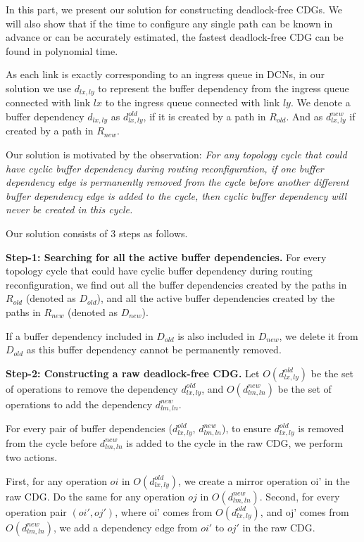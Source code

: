 In this part, we present our solution for constructing deadlock-free CDGs. We will also show that if the time to configure any single path can be known in advance or can be accurately estimated, the fastest deadlock-free CDG can be found in polynomial time.

As each link is exactly corresponding to an ingress queue in DCNs, in our solution we use $d_{lx,ly}$ to represent the buffer dependency from the ingress queue connected with link $lx$ to the ingress queue connected with link $ly$. We denote a buffer dependency $d_{lx,ly}$ as $d^{old}_{lx,ly}$, if it is created by a path in $R_{old}$. And as $d^{new}_{lx,ly}$ if created by a path in $R_{new}$.

Our solution is motivated by the observation: \textit{For any topology cycle that could have cyclic buffer dependency during routing reconfiguration, if one buffer dependency edge is permanently removed from the cycle before another different buffer dependency edge is added to the cycle, then cyclic buffer dependency will never be created in this cycle.} 


Our solution consists of 3 steps as follows.

\textbf{Step-1: Searching for all the active buffer dependencies.} For every topology cycle that could have cyclic buffer dependency during routing reconfiguration, we find out all the buffer dependencies created by the paths in $R_{old}$ (denoted as $D_{old}$), and all the active buffer dependencies created by the paths in $R_{new}$ (denoted as $D_{new}$). 

If a buffer dependency included in $D_{old}$ is also included in $D_{new}$, we delete it from $D_{old}$ as this buffer dependency cannot be permanently removed.

\textbf{Step-2: Constructing a raw deadlock-free CDG.} Let $O(d^{old}_{lx,ly})$ be the set of operations to remove the dependency $d^{old}_{lx,ly}$, and $O(d^{new}_{lm,ln})$ be the set of operations to add the dependency $d^{new}_{lm,ln}$.

For every pair of buffer dependencies ($d^{old}_{lx,ly}$,  $d^{new}_{lm,ln}$), to ensure $d^{old}_{lx,ly}$ is removed from the cycle before  $d^{new}_{lm,ln}$ is added to the cycle in the raw CDG, we perform two actions. 

First,  for any operation $oi$ in $O(d^{old}_{lx,ly})$, we create a mirror operation oi' in the raw CDG. Do the same for any operation $oj$ in $O(d^{new}_{lm,ln})$. Second, for every operation pair $(oi', oj')$, where oi' comes from $O(d^{old}_{lx,ly})$, and oj' comes from $O(d^{new}_{lm,ln})$, we add a dependency edge from $oi'$ to $oj'$ in the raw CDG.


